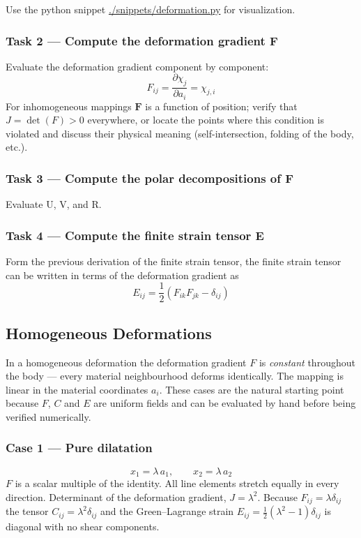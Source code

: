\documentclass[11pt]{article}
\begin{document}
Use the python snippet \url{./snippets/deformation.py} for visualization.
\subsubsection*{Task 2 — Compute the deformation gradient F}
\label{sec:orgaab62ae}
Evaluate the deformation gradient component by component:
\[
  F_{ij} = \frac{\partial \chi_j}{\partial a_i} = \chi_{j,i}
\]
For inhomogeneous mappings \(\boldsymbol{F}\) is a function of position; verify that \(J = \det(F) > 0\) everywhere, or locate the points where this condition is violated and discuss their physical meaning (self-intersection, folding of the body, etc.).
\subsubsection*{Task 3 — Compute the polar decompositions of F}
\label{sec:org11cbae8}
Evaluate U, V, and R.
\subsubsection*{Task 4 — Compute the finite strain tensor E}
\label{sec:orga9901e5}
Form the previous derivation of the finite strain tensor, the finite strain tensor can be written in terms of the deformation gradient as 
\[
  E_{ij} = \frac{1}{2}(F_{ik} F_{jk} - \delta_{ij})
\]
\subsection*{Homogeneous Deformations}
\label{sec:orge1561df}
In a homogeneous deformation the deformation gradient \(F\) is
\emph{constant} throughout the body — every material neighbourhood deforms
identically.  The mapping is linear in the material coordinates \(a_i\).
These cases are the natural starting point because \(F\), \(C\) and \(E\)
are uniform fields and can be evaluated by hand before being verified
numerically.
\subsubsection*{Case 1 — Pure dilatation}
\label{sec:orga03f387}
\[
  x_1 = \lambda\, a_1, \qquad x_2 = \lambda\, a_2
\]
\(F\) is a scalar multiple of the identity.  All line elements stretch
equally in every direction. Determinant of the deformation gradient, \(J = \lambda^2\).  Because \(F_{ij} = \lambda\delta_{ij}\) the tensor \(C_{ij} = \lambda^2 \delta_{ij}\) and the Green--Lagrange strain \(E_{ij} = \tfrac{1}{2}(\lambda^2 - 1)\delta_{ij}\) is diagonal with no shear components.
\end{document}
